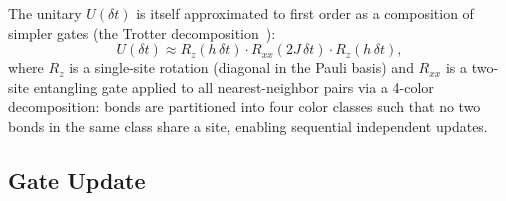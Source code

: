 \documentclass[11pt]{article}
\begin{document}
The unitary $U(\delta t)$ is itself approximated to first order as a
composition of simpler gates (the Trotter
decomposition~\citep{suzuki1976generalized}):
\begin{equation}
  U(\delta t) \approx R_z(h\,\delta t) \cdot R_{xx}(2J\,\delta t) \cdot R_z(h\,\delta t),
  \label{eq:trotter}
\end{equation}
where $R_z$ is a single-site rotation (diagonal in the Pauli basis) and $R_{xx}$
is a two-site entangling gate applied to all nearest-neighbor pairs via a
4-color decomposition: bonds are partitioned into four color classes such that no
two bonds in the same class share a site, enabling sequential independent updates.

\subsection{Gate Update}
\label{sec:gate_update}
\end{document}

